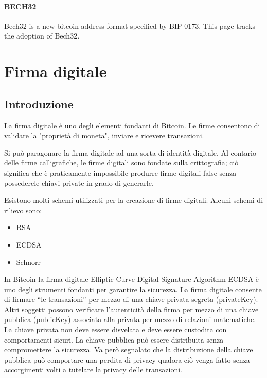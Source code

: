 \documentclass{book}
\theoremstyle{definition}
\begin{document}
\paragraph{BECH32}

Bech32 is a new bitcoin address format specified by BIP 0173. This page tracks the adoption of Bech32.

\newpage
\section{Firma digitale}

\subsection{Introduzione}

La firma digitale è uno degli elementi fondanti di Bitcoin. Le firme consentono di validare la "proprietà di moneta", inviare
e ricevere transazioni.

Si può paragonare la firma digitale ad una sorta di identità digitale. Al contario delle firme calligrafiche, le firme digitali
sono fondate sulla crittografia; ciò significa che è praticamente impossibile produrre firme digitali false senza possederele chiavi private 
in grado di generarle.

Esistono molti schemi utilizzati per la creazione di firme digitali. Alcuni schemi di rilievo sono:

\begin{itemize}
    \item RSA
    \item ECDSA
    \item Schnorr
\end{itemize}

In Bitcoin la firma digitale Elliptic Curve Digital Signature Algorithm ECDSA è uno degli strumenti fondanti per garantire la sicurezza.
La firma digitale consente di firmare “le transazioni” per mezzo di una chiave privata segreta (privateKey). Altri soggetti possono verificare l’autenticità della firma per mezzo di una chiave pubblica (publicKey) associata alla privata per mezzo di relazioni matematiche.
La chiave privata non deve essere disvelata e deve essere custodita con comportamenti sicuri.
La chiave pubblica può essere distribuita senza compromettere la sicurezza. Va però segnalato che la distribuzione della chiave pubblica può comportare una perdita di privacy qualora ciò venga fatto senza accorgimenti volti a tutelare la privacy delle transazioni.
\end{document}

